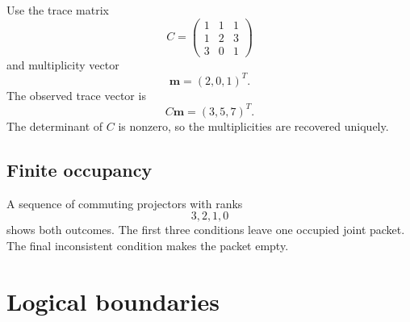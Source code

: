 \documentclass{aomart}
\theoremstyle{definition}
\theoremstyle{remark}
\begin{document}
Use the trace matrix
\[
C=
\begin{pmatrix}
1&1&1\\
1&2&3\\
3&0&1
\end{pmatrix}
\]
and multiplicity vector
\[
\bm m=(2,0,1)^T.
\]
The observed trace vector is
\[
C\bm m=(3,5,7)^T.
\]
The determinant of \(C\) is nonzero, so the multiplicities are recovered uniquely.

\subsection{Finite occupancy}

A sequence of commuting projectors with ranks
\[
3,2,1,0
\]
shows both outcomes. The first three conditions leave one occupied joint packet. The final inconsistent condition makes the packet empty.

\section{Logical boundaries}\label{sec:boundaries}
\end{document}
